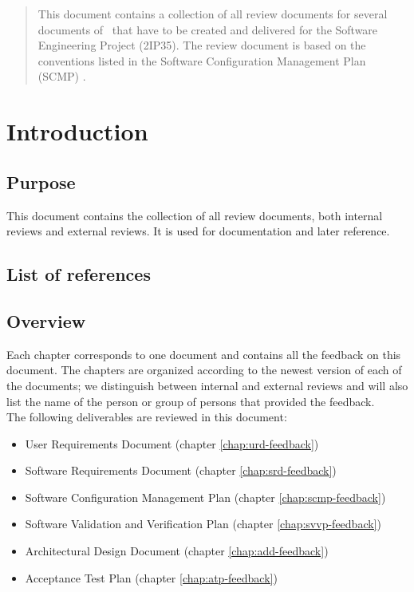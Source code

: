 \documentclass[%
		pathtobase=..,%
		titlefull={Review Document},%
		titleabbr=Review,%
		version=0.10]{fingerpaint}
\begin{document}
\maketitle{}

\begin{abstract}
This document contains a collection of all review documents for several documents of \projectname\ that have to be created and delivered for the Software Engineering Project (2IP35). The review document is based on the conventions listed in the Software Configuration Management Plan (SCMP) \cite{scmp}.
\end{abstract}

\tableofcontents



\chapter{Introduction}
\section{Purpose}
This document contains the collection of all review documents, both internal reviews and external reviews. It is used for documentation and later reference.

\section{List of references}


\section{Overview}
Each chapter corresponds to one document and contains all the feedback on this document. The chapters are organized according to the newest version of each of the documents; we distinguish between internal and external reviews and will also list the name of the person or group of persons that provided the feedback. \\
The following deliverables are reviewed in this document:
\begin{itemize}
\item User Requirements Document \cite{urd} (chapter \ref{chap:urd-feedback})
\item Software Requirements Document \cite{srd} (chapter \ref{chap:srd-feedback})
\item Software Configuration Management Plan \cite{scmp} (chapter \ref{chap:scmp-feedback})
\item Software Validation and Verification Plan \cite{svvp} (chapter \ref{chap:svvp-feedback})
\item Architectural Design Document \cite{add} (chapter \ref{chap:add-feedback})
\item Acceptance Test Plan \cite{atp} (chapter \ref{chap:atp-feedback})
\end{itemize}










\end{document}
